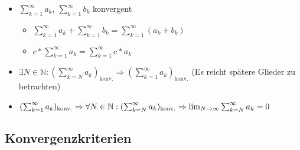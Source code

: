 \begin{itemize}
  \item $\sum_{k=1}^\infty a_k$, $\sum_{k=1}^\infty b_k$ konvergent
        \begin{itemize}
          \item $\sum_{k=1}^\infty a_k + \sum_{k=1}^\infty b_k = \sum_{k=1}^\infty (a_k + b_k)$
          \item $c * \sum_{k=1}^\infty a_k = \sum_{k=1}^\infty c * a_k$
        \end{itemize}

  \item $\exists N \in \mathbb{N}: (\sum_{k=N}^\infty a_k)_\text{konv.} \Rightarrow (\sum_{k=1}^\infty a_k)_\text{konv.}$ (Es reicht spätere Glieder zu betrachten)

  \item $(\sum_{k=1}^\infty a_k)_\text{konv.} \linebreak \Rightarrow \forall N \in \mathbb{N}: (\sum_{k=N}^\infty a_k)_\text{konv.} \linebreak \Rightarrow \lim_{N \rightarrow \infty} \sum_{k=N}^\infty a_k = 0$
\end{itemize}

\subsection{Konvergenzkriterien}

